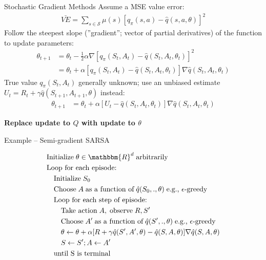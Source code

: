 \documentclass[ignorenonframetext,xcolor=x11names]{beamer}
\begin{document}
\begin{frame}[label=full]{Stochastic Gradient Methods}
Assume a MSE value error:
\begin{align*}
\bar{VE} = \sum_{s \in \mathcal{S}} \mu(s) \left[ q_\pi(s, a) - \hat{q}(s, a, \theta) \right]^2
\end{align*}
Follow the steepest slope (''gradient''; vector of partial derivatives) of the function to update parameters:
\begin{align*}
\theta_{t+1} &= \theta_t - \frac{1}{2} \alpha \nabla \left[ q_\pi(S_t, A_t) - \hat{q}(S_t, A_t,  \theta_t)\right]^2 \\
 &= \theta_t + \alpha \left[ q_\pi(S_t, A_t) - \hat{q}(S_t, A_t, \theta_t)\right] \nabla \hat{q}(S_t, A_t, \theta_t)
\end{align*}
True value $q_\pi(S_t, A_t)$ generally unknown; use an unbiased estimate $U_t = R_t + \gamma \hat{q}(S_{t+1}, A_{t+1}, \theta)$ instead:
\begin{align*}
\theta_{t+1} &= \theta_t + \alpha \left[ U_t - \hat{q}(S_t, A_t, \theta_t)\right] \nabla \hat{q}(S_t, A_t, \theta_t)
\end{align*}
\vspace{-\baselineskip}
\begin{block}{}
\textbf{Replace update to $Q$ with update to $\theta$}
\end{block}
\end{frame}

\begin{frame}[label=full]{Example -- Semi-gradient SARSA}
\begin{block}{}
\begin{align*}
& \text{Initialize}\; \theta \in \mathbbm{R}^d \; \text{arbitrarily} \\
& \text{Loop for each episode:} \\
& \quad \text{Initialize}\; S_0 \\
& \quad \text{Choose}\; A \; \text{as a function of}\; \hat{q}(S_0, ., \theta) \; \text{e.g., $\epsilon$-greedy} \\ 
& \quad \text{Loop for each step of episode:} \\
& \quad \quad \text{Take action}\; A, \; \text{observe} \; R, S' \\
& \quad \quad \text{Choose}\; A' \; \text{as a function of}\; \hat{q}(S', ., \theta) \; \text{e.g., $\epsilon$-greedy} \\ 
& \quad \quad \theta \leftarrow \theta + \alpha [R + \gamma \hat{q}(S', A', \theta) - \hat{q}(S, A, \theta)] \nabla \hat{q}(S, A, \theta) \\
& \quad \quad S \leftarrow S'; A \leftarrow A' \\
& \quad \text{until S is terminal}
\end{align*}
\vspace{-\baselineskip}
\end{block}
\end{frame}
\end{document}
